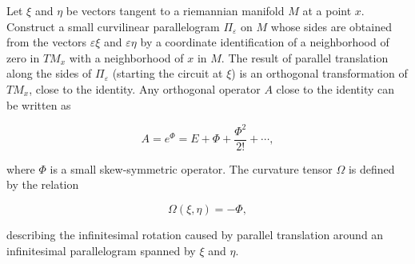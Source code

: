 Let $\xi$ and $\eta$ be vectors tangent to a riemannian manifold $M$ at a point $x$. Construct a small curvilinear parallelogram $\Pi_\varepsilon$ on $M$ whose sides are obtained from the vectors $\varepsilon\xi$ and $\varepsilon\eta$ by a coordinate identification of a neighborhood of zero in $TM_x$ with a neighborhood of $x$ in $M$. The result of parallel translation along the sides of $\Pi_\varepsilon$ (starting the circuit at $\xi$) is an orthogonal transformation of $TM_x$, close to the identity. Any orthogonal operator $A$ close to the identity can be written as

$$A = e^{\Phi} = E + \Phi + \frac{\Phi^2}{2!} + \cdots,$$

where $\Phi$ is a small skew-symmetric operator. The curvature tensor $\Omega$ is defined by the relation

$$\Omega(\xi, \eta) = -\Phi,$$

describing the infinitesimal rotation caused by parallel translation around an infinitesimal parallelogram spanned by $\xi$ and $\eta$.
